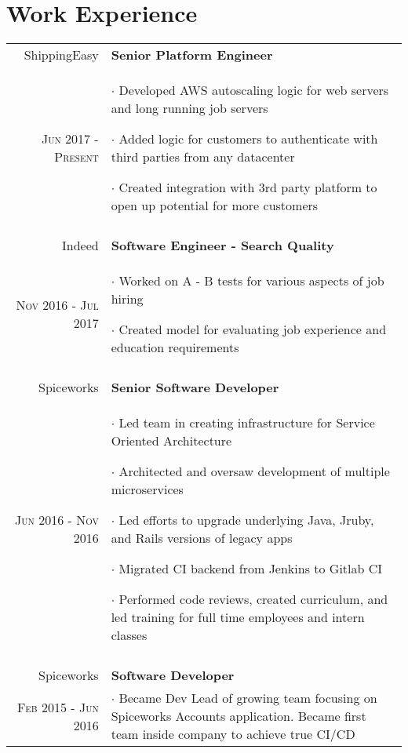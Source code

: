 \documentclass[a4paper,10pt]{article}
\begin{document}
\section{Work Experience}
\begin{tabular}{r|p{11cm}}
 ShippingEasy & \textbf{Senior Platform Engineer} \\
 \textsc{Jun 2017 - Present} &
	\footnotesize{
		$\cdot$ Developed AWS autoscaling logic for web servers and long running job servers

		$\cdot$ Added logic for customers to authenticate with third parties from any datacenter

		$\cdot$ Created integration with 3rd party platform to open up potential for more customers
	}
	\\\multicolumn{2}{c}{} \\

	Indeed & \textbf{Software Engineer - Search Quality} \\
	\textsc{Nov 2016 - Jul 2017} &
	 \footnotesize{
		 $\cdot$ Worked on A - B tests for various aspects of job hiring

		 $\cdot$ Created model for evaluating job experience and education requirements
	 }
	 \\\multicolumn{2}{c}{} \\

	 Spiceworks & \textbf{Senior Software Developer} \\
	 \textsc{Jun 2016 - Nov 2016} &
		\footnotesize{
			$\cdot$ Led team in creating infrastructure for Service Oriented Architecture

			$\cdot$ Architected and oversaw development of multiple microservices

			$\cdot$ Led efforts to upgrade underlying Java, Jruby, and Rails versions of legacy apps

			$\cdot$ Migrated CI backend from Jenkins to Gitlab CI

			$\cdot$ Performed code reviews, created curriculum, and led training for full time employees and intern classes
		}
		\\\multicolumn{2}{c}{} \\

	Spiceworks & \textbf{Software Developer} \\
	\textsc{Feb 2015 - Jun 2016} &
	 \footnotesize{

		 $\cdot$ Became Dev Lead of growing team focusing on Spiceworks Accounts application.
		 Became first team inside company to achieve true CI/CD

}
\end{tabular}
\end{document}
